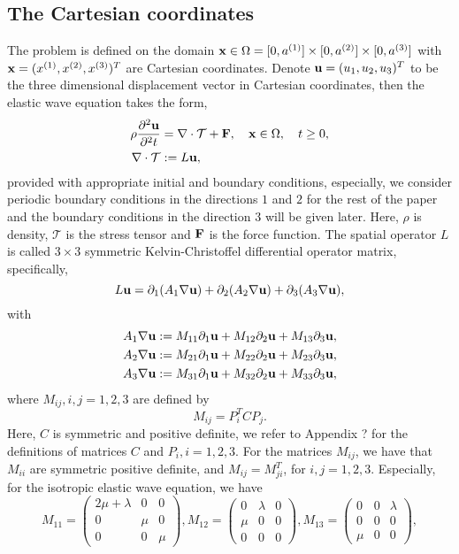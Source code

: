 \subsection{The Cartesian coordinates}
The problem is defined on the domain ${\bf x}\in\Omega = [0,a^{(1)}]\times[0,a^{(2)}]\times[0,a^{(3)}]$ with ${\bf x} = (x^{(1)},x^{(2)},x^{(3)})^T$ are Cartesian coordinates. Denote ${\bf u} = (u_1,u_2,u_3)^T$ to be the three dimensional displacement vector in Cartesian coordinates, then the elastic wave equation takes the form,
\begin{align*}
\rho\frac{\partial^2{\bf u}}{\partial^2 t} &= \nabla\cdot\mathcal{T} + {\bf F}, \ \ \ {\bf x}\in\Omega,\ \ \ t\geq 0,\\
\nabla\cdot\mathcal{T} &:= L{\bf u},
\end{align*}
provided with appropriate initial and boundary conditions, especially, we consider periodic boundary conditions in the directions $1$ and $2$ for the rest of the paper and the boundary conditions in the direction $3$ will be given later. Here, $\rho$ is density, $\mathcal{T}$ is the stress tensor and ${\bf F}$ is the force function. The spatial operator $L$ is called $3\times3$ symmetric Kelvin-Christoffel differential operator matrix, specifically,
\begin{equation*}
L{\bf  u} = \partial_1(A_1\nabla{\bf u}) + \partial_2(A_2\nabla{\bf u}) + \partial_3(A_3\nabla{\bf u}),
\end{equation*}
with
\begin{align*}
A_1\nabla{\bf u} &:= M_{11}\partial_1{\bf u} + M_{12}\partial_2{\bf u} + M_{13}\partial_3{\bf u}, \\
A_2\nabla{\bf u} &:= M_{21}\partial_1{\bf u} + M_{22}\partial_2{\bf u} + M_{23}\partial_3{\bf u}, \\
A_3\nabla{\bf u} &:= M_{31}\partial_1{\bf u} + M_{32}\partial_2{\bf u} + M_{33}\partial_3{\bf u},
\end{align*}
where $M_{ij}, i,j = 1,2,3$ are defined by
\begin{equation}\label{Mmatrices}
M_{ij} = P^T_iCP_j.
\end{equation}
Here, $C$ is symmetric and positive definite, we refer to Appendix ? for the definitions of matrices $C$ and $P_i, i = 1,2,3$. For the matrices $M_{ij}$, we have that $M_{ii}$ are symmetric positive definite, and $M_{ij}=M^T_{ji}$, for $i,j=1,2,3$. Especially, for the isotropic elastic wave equation, we have
\[ M_{11} = \left(\begin{array}{ccc}
2\mu+\lambda & 0 & 0\\
0 & \mu & 0\\
0 & 0 & \mu\end{array}\right), M_{12} = \left(\begin{array}{ccc}
0 & \lambda & 0\\
\mu & 0 & 0\\
0 & 0 & 0\end{array}\right), M_{13} = \left(\begin{array}{ccc}
0 & 0 & \lambda\\
0 & 0 & 0\\
\mu & 0 & 0\end{array}\right),\]
